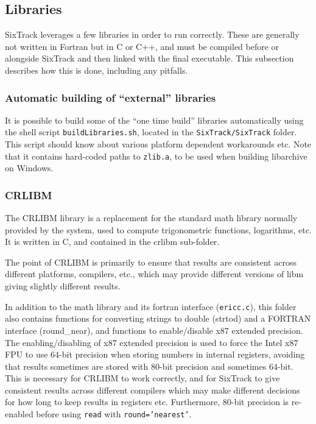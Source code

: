 \documentclass[english,BCOR=0mm,DIV=18]{scrartcl}
\begin{document}
\subsection{Libraries}
SixTrack leverages a few libraries in order to run correctly.
These are generally not written in Fortran but in C or C++, and must be compiled before or alongside SixTrack and then linked with the final executable.
This subsection describes how this is done, including any pitfalls.

\subsubsection{Automatic building of ``external'' libraries}
\label{sec:building:libs:automatic}

It is possible to build some of the ``one time build'' libraries automatically using the shell script \texttt{buildLibraries.sh}, located in the \texttt{SixTrack/SixTrack} folder.
This script should know about various platform dependent workarounds etc.
Note that it contains hard-coded paths to \texttt{zlib.a}, to be used when building libarchive on Windows.

\subsubsection{CRLIBM}
\label{sec:building:libs:crlibm}
The CRLIBM library  is a replacement for the standard math library normally provided by the system, used to compute trigonometric functions, logarithms, etc.
It is written in C, and contained in the \textrm{crlibm} sub-folder.

The point of CRLIBM is primarily to ensure that results are consistent across different platforms, compilers, etc., which may provide different versions of libm giving slightly different results.

In addition to the math library and its fortran interface (\texttt{ericc.c}), this folder also contains functions for converting strings to double (\textrm{strtod}) and a FORTRAN interface (\textrm{round\_near}), and functions to enable/disable x87 extended precision.
The enabling/disabling of x87 extended precision is used to force the Intel x87 FPU to use 64-bit precision when storing numbers in internal registers, avoiding that results sometimes are stored with 80-bit precision and sometimes 64-bit.
This is necessary for CRLIBM to work correctly, and for SixTrack to give consistent results across different compilers which may make different decisions for how long to keep results in registers etc.
Furthermore, 80-bit precision is re-enabled before using \texttt{read} with \texttt{round='nearest'}.
\end{document}

